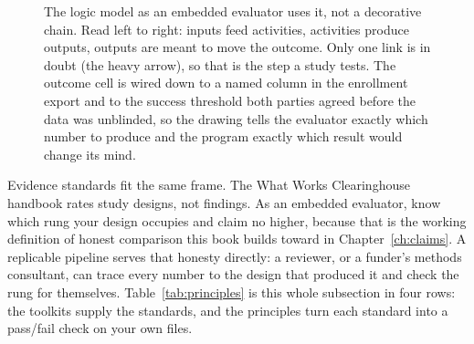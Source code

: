 \documentclass[
    a4paper,
    fontsize=10pt,
    twoside=true,
    numbers=noenddot,
]{kaobook}
\begin{document}
\begin{figure}
\centering
{}
\caption[A logic model wired to a variable and a threshold]{The logic model as an embedded evaluator uses it, not a decorative chain. Read left to right: inputs feed activities, activities produce outputs, outputs are meant to move the outcome. Only one link is in doubt (the heavy arrow), so that is the step a study tests. The outcome cell is wired down to a named column in the enrollment export and to the success threshold both parties agreed before the data was unblinded, so the drawing tells the evaluator exactly which number to produce and the program exactly which result would change its mind.}
\label{fig:ch01-viz-logic}
\end{figure}

Evidence standards fit the same frame. The What Works Clearinghouse handbook \parencite{wwc2022handbook} rates study designs, not findings. As an embedded evaluator, know which rung your design occupies and claim no higher, because that is the working definition of honest comparison this book builds toward in Chapter~\ref{ch:claims}. A replicable pipeline serves that honesty directly: a reviewer, or a funder's methods consultant, can trace every number to the design that produced it and check the rung for themselves. Table~\ref{tab:principles} is this whole subsection in four rows: the toolkits supply the standards, and the principles turn each standard into a pass\slash fail check on your own files.
\end{document}
